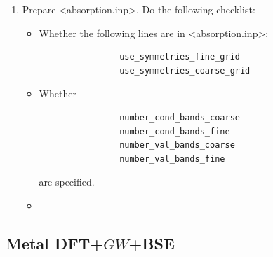 \documentclass[hyperref, a4paper, 12pt]{report}
\def\texttt#1{<#1>}%
\newcommand{\shortcode}[1]{\texttt{#1}}
\begin{document}
\begin{enumerate}
\begin{enumerate}
        \item Prepare \shortcode{absorption.inp}. Do the following checklist:
        \begin{itemize}
            \item Whether the following lines are in \shortcode{absorption.inp}:
            \begin{lstlisting}
                use_symmetries_fine_grid
                use_symmetries_coarse_grid
            \end{lstlisting}
            \item Whether 
            \begin{lstlisting}
                number_cond_bands_coarse
                number_cond_bands_fine
                number_val_bands_coarse
                number_val_bands_fine
            \end{lstlisting}
            are specified.
            \item 
        \end{itemize}
    \end{enumerate}
\end{enumerate}

\subsection{Metal DFT+$GW$+BSE}\label{sec:metal-sop}
\end{document}
